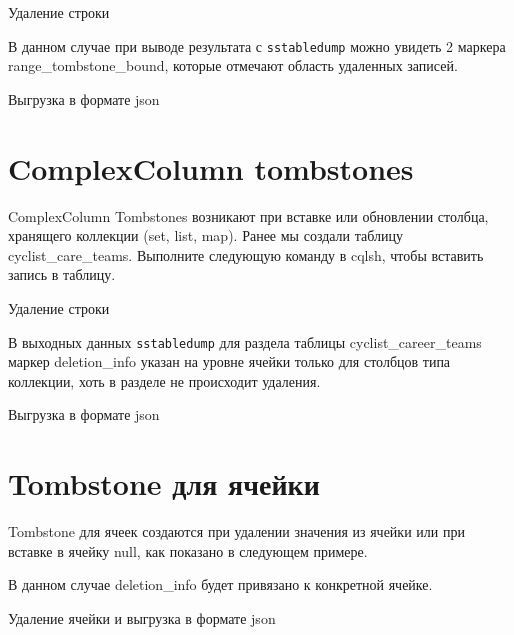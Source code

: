 \begin{image}
	\caption{Удаление строки}
	\label{fig:cqlsh:range:delete}
\end{image}

В данном случае при выводе результата с \texttt{sstabledump} можно увидеть 2
маркера range\_tombstone\_bound, которые отмечают область удаленных записей.

\begin{image}
	\caption{Выгрузка в формате json}
	\label{fig:sstabledump:range:delete}
\end{image}

\section{ComplexColumn tombstones}

ComplexColumn Tombstones возникают при вставке или обновлении
столбца, хранящего коллекции (set, list, map). Ранее мы создали таблицу
cyclist\_care\_teams. Выполните следующую команду в cqlsh, чтобы
вставить запись в таблицу.

\begin{image}
	\caption{Удаление строки}
	\label{fig:cqlsh:complexcolumn}
\end{image}

В выходных данных \texttt{sstabledump} для раздела таблицы
cyclist\_career\_teams маркер deletion\_info указан на уровне ячейки
только для столбцов типа коллекции, хоть в разделе не происходит удаления.

\begin{image}
	\caption{Выгрузка в формате json}
	\label{fig:sstabledump:complexcolumn}
\end{image}

\section{Tombstone для ячейки}

Tombstone для ячеек создаются при удалении значения из ячейки или при
вставке в ячейку null, как показано в следующем примере.\par
В данном случае deletion\_info будет привязано к конкретной ячейке.

\begin{image}
	\caption{Удаление ячейки и выгрузка в формате json}
	\label{fig:cqlsh-sstabledump:complexcolumn}
\end{image}

